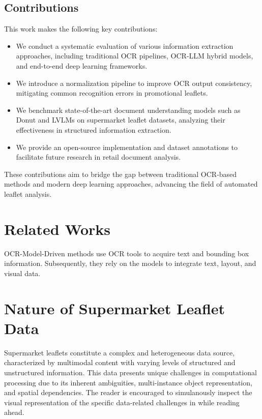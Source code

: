 \documentclass[11pt]{article}
\begin{document}
\subsection{Contributions}

This work makes the following key contributions:
\begin{itemize}
    \item We conduct a systematic evaluation of various information extraction approaches, including traditional OCR pipelines, OCR-LLM hybrid models, and end-to-end deep learning frameworks.
    \item We introduce a normalization pipeline to improve OCR output consistency, mitigating common recognition errors in promotional leaflets.
    \item We benchmark state-of-the-art document understanding models such as Donut and LVLMs on supermarket leaflet datasets, analyzing their effectiveness in structured information extraction.
    \item We provide an open-source implementation and dataset annotations to facilitate future research in retail document analysis.
\end{itemize}
These contributions aim to bridge the gap between traditional OCR-based methods and modern deep learning approaches, advancing the field of automated leaflet analysis.



\section{Related Works}
OCR-Model-Driven methods use OCR tools to acquire text
and bounding box information. Subsequently, they rely
on the models to integrate text, layout, and visual data.



\section{Nature of Supermarket Leaflet Data}
Supermarket leaflets constitute a complex and heterogeneous data source, characterized by multimodal content with varying levels of structured and unstructured information. This data presents unique challenges in computational processing due to its inherent ambiguities, multi-instance object representation, and spatial dependencies. The reader is encouraged to simulanously inspect the visual representation of the specific data-related challenges in  while reading ahead.
\end{document}
